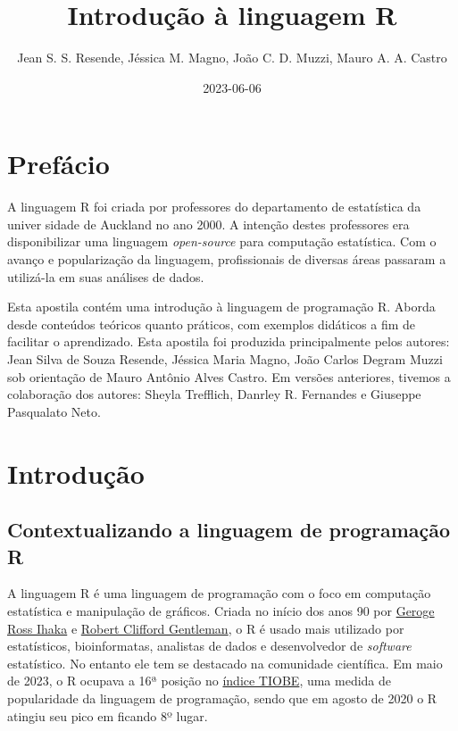 \documentclass[
]{book}
\title{Introdução à linguagem R}
\author{Jean S. S. Resende, Jéssica M. Magno, João C. D. Muzzi, Mauro A. A. Castro}
\date{2023-06-06}
\begin{document}
\maketitle

{
\setcounter{tocdepth}{1}
\tableofcontents
}
\hypertarget{prefuxe1cio}{%
\chapter{Prefácio}\label{prefuxe1cio}}

A linguagem R foi criada por professores do departamento de estatística da univer sidade de Auckland no ano 2000. A intenção destes professores era disponibilizar uma linguagem \emph{open-source} para computação estatística. Com o avanço e popularização da linguagem, profissionais de diversas áreas passaram a utilizá-la em suas análises de dados.

Esta apostila contém uma introdução à linguagem de programação R. Aborda desde conteúdos teóricos quanto práticos, com exemplos didáticos a fim de facilitar o aprendizado. Esta apostila foi produzida principalmente pelos autores: Jean Silva de Souza Resende, Jéssica Maria Magno, João Carlos Degram Muzzi sob orientação de Mauro Antônio Alves Castro. Em versões anteriores, tivemos a colaboração dos autores: Sheyla Trefflich, Danrley R. Fernandes e Giuseppe Pasqualato Neto.

\hypertarget{introduuxe7uxe3o}{%
\chapter{Introdução}\label{introduuxe7uxe3o}}

\hypertarget{contextualizando-a-linguagem-de-programauxe7uxe3o-r}{%
\section{Contextualizando a linguagem de programação R}\label{contextualizando-a-linguagem-de-programauxe7uxe3o-r}}

A linguagem R é uma linguagem de programação com o foco em computação estatística e manipulação de gráficos. Criada no início dos anos 90 por \href{https://en.wikipedia.org/wiki/Ross_Ihaka}{Geroge Ross Ihaka} e \href{https://en.wikipedia.org/wiki/Robert_Gentleman_(statistician)}{Robert Clifford Gentleman}, o R é usado mais utilizado por estatísticos, bioinformatas, analistas de dados e desenvolvedor de \emph{software} estatístico. No entanto ele tem se destacado na comunidade científica. Em maio de 2023, o R ocupava a 16ª posição no \href{https://www.tiobe.com/tiobe-index/}{índice TIOBE}, uma medida de popularidade da linguagem de programação, sendo que em agosto de 2020 o R atingiu seu pico em ficando 8º lugar.
\end{document}
